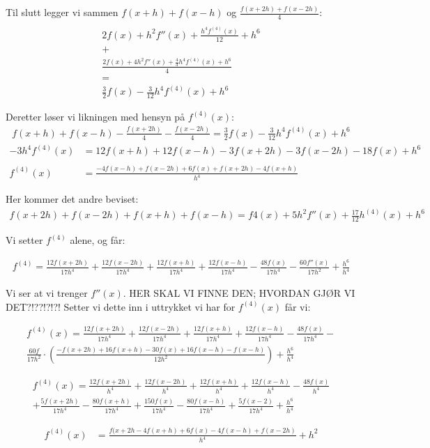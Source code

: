 Til slutt legger vi sammen $f(x+h)+f(x-h)$ og $\frac{f(x+2h)+f(x-2h)}{4}$: 
\begin{multline}
	\\
	2f(x)+h^2f''(x)+\frac{h^4f^{(4)}(x)}{12} + h^6 \\
	+\\
	\frac{2f(x)+4h^2f''(x)+\frac{4}{3}h^4f^{(4)}(x)+h^6 }{4}\\
	=\\
	\frac{3}{2}f(x)-\frac{3}{12}h^4f^{(4)}(x)+h^6
\end{multline}

Deretter løser vi likningen med hensyn på $f^{(4)}(x)$: 
\begin{align}
    f(x+h)+f(x-h)-\frac{f(x+2h)}{4}-\frac{f(x-2h)}{4}=\frac{3}{2}f(x)-\frac{3}{12}h^4f^{(4)}(x)+h^6\nonumber
\end{align}
\begin{align}
     -3h^4f^{(4)}(x)&=12f(x+h)+12f(x-h)-3f(x+2h)-3f(x-2h)-18f(x) +h^6 \nonumber \\
     \nonumber \\
	f^{(4)}(x)&=\frac{-4f(x-h)+f(x-2h)+6f(x)+f(x+2h)-4f(x+h)}{h^4}
\end{align}
 

Her kommer det andre beviset: 
\begin{align}
f(x+2h)+f(x-2h)+f(x+h)+f(x-h)=f4(x)+5h^2f''(x)+\frac{17}{12}h^{(4)}(x)+h^6 \nonumber
\end{align}

Vi setter $f^{(4)}$ alene, og får: 

\begin{align}
	f^{(4)}=\frac{12f(x+2h)}{17h^4}+\frac{12f(x-2h)}{17h^4}+\frac{12f(x+h)}{17h^4}+\frac{12f(x-h)}{17h^4}-\frac{48f(x)}{17h^4}-\frac{60f''(x)}{17h^2}+\frac{h^6}{h^4}
\end{align}

Vi ser at vi trenger $f''(x)$. HER SKAL VI FINNE DEN; HVORDAN GJØR VI DET?!??!?!?! 
Setter vi dette inn i uttrykket vi har for $f^{(4)}(x)$ får vi: 

\begin{multline}
    f^{(4)}(x)=\frac{12f(x+2h)}{17h^4}+\frac{12f(x-2h)}{17h^4}+\frac{12f(x+h)}{17h^4}+\frac{12f(x-h)}{17h^4}-\frac{48f(x)}{17h^4}-\\ \frac{60f}{17h^2}\cdot (\frac{-f(x+2h)+16f(x+h)-30f(x)+16f(x-h)-f(x-h)}{12h^2})+\frac{h^6}{h^4} \nonumber
\end{multline}

\begin{multline}
    f^{(4)}(x)=\frac{12f(x+2h)}{h^4}+\frac{12f(x-2h)}{h^4}+\frac{12f(x+h)}{h^4}+\frac{12f(x-h)}{h^4}-\frac{48f(x)}{h^4} \\
    +\frac{5f(x+2h)}{17h^4}-\frac{80f(x+h)}{17h^4}+\frac{150f(x)}{17h^4}-\frac{80f(x-h)}{17h^4}+\frac{5f(x-2)}{17h^4} + \frac{h^6}{h^4} \nonumber
\end{multline}

\begin{align}
    f^{(4)}(x)&=\frac{f(x+2h-4f(x+h)+6f(x)-4f(x-h)+f(x-2h)}{h^4} + h^2
\end{align}